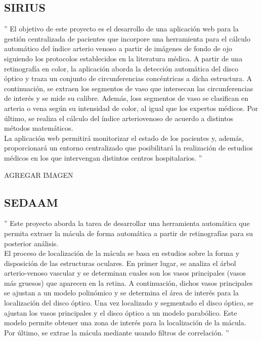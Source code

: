 \documentclass[14pt]{article}
\begin{document}
\subsection{SIRIUS}

'' El objetivo de este proyecto es el desarrollo de una aplicación web para la gestión centralizada de pacientes que incorpore una herramienta para el cálculo automático del índice arterio venoso a partir de imágenes de fondo de ojo siguiendo los protocolos establecidos en la literatura médica. A partir de una retinografía en color, la aplicación aborda la detección automática del disco óptico y traza un conjunto de circunferencias concéntricas a dicha estructura. A continuación, se extraen los segmentos de vaso que intersecan las circunferencias de interés y se mide su calibre. Además, loss segmentos de vaso se clasifican en arteria o vena según su intensidad de color, al igual que los expertos médicos. Por último, se realiza el cálculo del índice arteriovenoso de acuerdo a distintos métodos matemáticos.\\

La aplicación web permitirá monitorizar el estado de los pacientes y, además, proporcionará un entorno centralizado que posibilitará la realización de estudios médicos en los que intervengan distintos centros hospitalarios.   '' \cite{Sirius}

AGREGAR IMAGEN


\subsection{SEDAAM}
'' Este proyecto aborda la tarea de desarrollar una herramienta automática que permita extraer la mácula de forma automática a partir de retinografías para su posterior análisis.\\

El proceso de localización de la mácula se basa en estudios sobre la forma y disposición de las estructuras oculares. En primer lugar, se analiza el árbol arterio-venoso vascular y se determinan cuales son los vasos principales (vasos más gruesos) que aparecen en la retina. A continuación, dichos vasos principales se ajustan a un modelo polinómico y se determina el área de interés para la localización del disco óptico. Una vez localizado y segmentado el disco óptico, se ajustan los vasos principales y el disco óptico a un modelo parabólico. Este modelo permite obtener una zona de interés para la localización de la mácula. Por último, se extrae la mácula mediante usando filtros de correlación. '' \cite{Sedaam}
\end{document}
